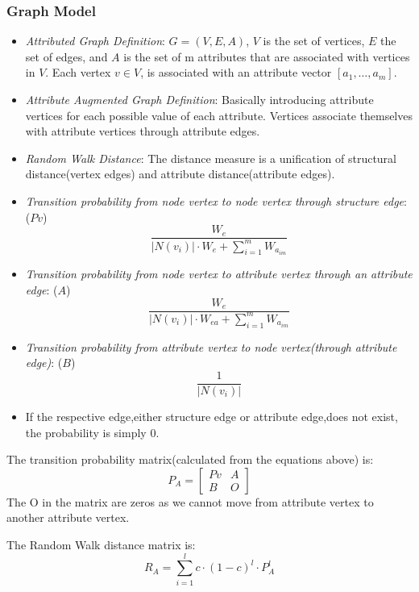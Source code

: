 \documentclass[]{beamer}
\begin{document}
	\begin{frame}[allowframebreaks]
		\frametitle{Graph Model}
		\begin{itemize}
			\item \emph{Attributed Graph Definition}: \(G=(V,E,A)\), \(V\) is the set of vertices, \(E\) the set of edges, and \(A\) is the set of m attributes that are associated with vertices in \(V\). Each vertex \(v \in V \), is associated with an attribute vector \([a_1,\ldots,a_m]\).
			\item \emph{Attribute Augmented Graph Definition}: Basically introducing attribute vertices for each possible value of each attribute. Vertices associate themselves with attribute vertices through attribute edges.
			\item \emph{Random Walk Distance}: The distance measure is a unification of structural distance(vertex edges) and attribute distance(attribute edges).
			
		\end{itemize}
		\framebreak
		\begin{itemize}
			\item \emph{Transition probability from node vertex to node vertex through structure edge}: ($Pv$)
			\[
			\frac{W_e}{|N(v_i)| \cdot W_e + \sum_{i=1}^{m} W_{a_{im}}}
			\]
			
			\item \emph{Transition probability from node vertex to attribute vertex through an attribute edge}: ($A$)
			\[
			\frac{W_e}{|N(v_i)| \cdot W_{ea} + \sum_{i=1}^{m} W_{a_{im}}}
			\]	
			
			\item \emph{Transition probability from attribute vertex to node vertex(through attribute edge)}:  ($B$)
			\[
			\frac{1}{|N(v_i)|}
			\]
			
			\item If the respective edge,either structure edge or attribute edge,does not exist, the probability is simply 0.
		\end{itemize}
		
		\framebreak
		The transition probability matrix(calculated from the equations above) is: 
		\[
		P_A = \begin{bmatrix}
			Pv & A \\
			B & O
		\end{bmatrix}
		\]
		The O in the matrix are zeros as we cannot move from attribute vertex to another attribute vertex.
		\linebreak[1]
		
		The Random Walk distance matrix is:
		\[
		R_A = \sum_{i=1}^{l} c \cdot (1-c)^l \cdot P_A^l
		\]
	\end{frame}
\end{document}
